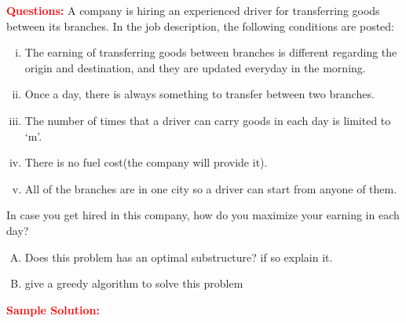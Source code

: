 \problem

\textcolor{Red}{\textbf{Questions:}}
A company is hiring an experienced driver for transferring goods between its branches. In the job description, the following conditions are posted:
\begin{enumerate}[i.]
	\item The earning of transferring goods between branches is different regarding the origin and destination, and they are updated everyday in the morning.
	\item Once a day, there is always something to transfer between two branches.
	\item The number of times that a driver can carry goods in each day is limited to `m'.
	\item There is no fuel cost(the company will provide it).
	\item All of the branches are in one city so a driver can start from anyone of them.
\end{enumerate}

In case you get hired in this company, how do you maximize your earning in each day?

\begin{enumerate}[A.]
	\item Does this problem has an optimal substructure? if so explain it.
	\item give a greedy algorithm to solve this problem
\end{enumerate}

\textcolor{Red}{\textbf{Sample Solution:}}
